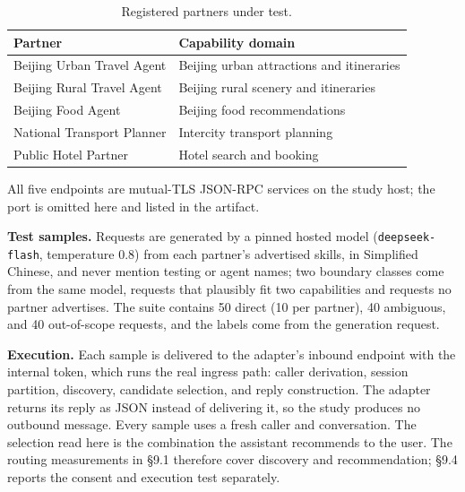 \documentclass[runningheads,a4paper]{llncs}
\begin{document}
\begin{table}[htbp]

\centering

\small

\caption{Registered partners under test.}\label{tab:3}

\begin{tabularx}{\textwidth}{@{}*{2}{X}@{}}

\toprule

\textbf{Partner} & \textbf{Capability domain} \\

\midrule

Beijing Urban Travel Agent & Beijing urban attractions and itineraries \\

Beijing Rural Travel Agent & Beijing rural scenery and itineraries \\

Beijing Food Agent & Beijing food recommendations \\

National Transport Planner & Intercity transport planning \\

Public Hotel Partner & Hotel search and booking \\

\bottomrule

\end{tabularx}

\end{table}

All five endpoints are mutual-TLS JSON-RPC services on the study host; the port is omitted here and listed in the artifact.

\textbf{Test samples.} Requests are generated by a pinned hosted model (\texttt{deepseek-flash}, temperature 0.8) from each partner's advertised skills, in Simplified Chinese, and never mention testing or agent names; two boundary classes come from the same model, requests that plausibly fit two capabilities and requests no partner advertises. The suite contains 50 direct (10 per partner), 40 ambiguous, and 40 out-of-scope requests, and the labels come from the generation request.

\textbf{Execution.} Each sample is delivered to the adapter's inbound endpoint with the internal token, which runs the real ingress path: caller derivation, session partition, discovery, candidate selection, and reply construction. The adapter returns its reply as JSON instead of delivering it, so the study produces no outbound message. Every sample uses a fresh caller and conversation. The selection read here is the combination the assistant recommends to the user. The routing measurements in §9.1 therefore cover discovery and recommendation; §9.4 reports the consent and execution test separately.
\end{document}
